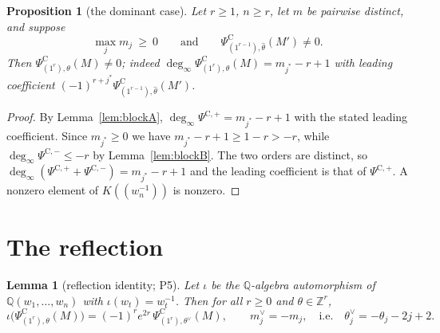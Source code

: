 \documentclass[11pt]{article}
\newtheorem{proposition}[theorem]{Proposition}
\newtheorem{lemma}[theorem]{Lemma}
\theoremstyle{definition}
\newcommand{\PsiC}{\Psi^{\mathrm{C}}}
\newcommand{\PsiCs}[1]{\Psi^{\mathrm{C},#1}}
\newcommand{\degi}{\deg_{\infty}}
\begin{document}
\begin{proposition}[the dominant case]\label{prop:caseA}\label{lem:order}
Let $r\ge1$, $n\ge r$, let $m$ be pairwise distinct, and suppose
\[
  \max_j m_j\ \ge\ 0
  \qquad\text{and}\qquad
  \PsiC_{(1^{r-1}),\hat\theta}(M')\ne0 .
\]
Then $\PsiC_{(1^r),\theta}(M)\ne0$; indeed
$\degi\PsiC_{(1^r),\theta}(M)=m_{j^\ast}-r+1$ with leading coefficient
$(-1)^{r+j^\ast}\PsiC_{(1^{r-1}),\hat\theta}(M')$.
\end{proposition}

\begin{proof}
By Lemma~\ref{lem:blockA}, $\degi\PsiCs{+}=m_{j^\ast}-r+1$ with the stated leading
coefficient. Since $m_{j^\ast}\ge0$ we have $m_{j^\ast}-r+1\ge1-r>-r$, while
$\degi\PsiCs{-}\le-r$ by Lemma~\ref{lem:blockB}. The two orders are distinct, so
$\degi(\PsiCs{+}+\PsiCs{-})=m_{j^\ast}-r+1$ and the leading coefficient is that of $\PsiCs{+}$.
A nonzero element of $K((w_n^{-1}))$ is nonzero.
\end{proof}

\section{The reflection}

\begin{lemma}[reflection identity; P5]\label{lem:reflect}
Let $\iota$ be the $\mathbb{Q}$-algebra automorphism of $\mathbb{Q}(w_1,\dots,w_n)$ with
$\iota(w_t)=w_t^{-1}$. Then for all $r\ge0$ and $\theta\in\mathbb{Z}^r$,
\[
  \iota\bigl(\PsiC_{(1^r),\theta}(M)\bigr)
  =(-1)^r e^{2r}\,\PsiC_{(1^r),\theta^\vee}(M),
  \qquad m^\vee_j=-m_j,\quad\text{i.e.}\quad \theta^\vee_j=-\theta_j-2j+2 .
\]
\end{lemma}
\end{document}
